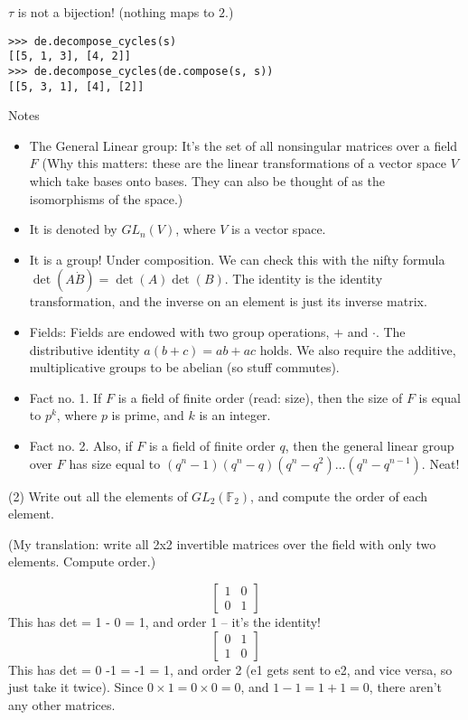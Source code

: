 \documentclass[1    0pt, answers]{exam} \renewcommand{\baselinestretch}{1.05}
\theoremstyle{plain}
\theoremstyle{definition}
\begin{document}
\begin{questions}
\begin{solution}
$\tau$ is not a bijection! (nothing maps to $2$.)
\begin{verbatim}
>>> de.decompose_cycles(s)
[[5, 1, 3], [4, 2]]
>>> de.decompose_cycles(de.compose(s, s))
[[5, 3, 1], [4], [2]]
\end{verbatim}
\end{solution}


\begin{solution}
\end{solution}

Notes
\begin{itemize}
    \item The General Linear group: It's the set of all nonsingular matrices over a field $F$ (Why this matters: these are the linear transformations of a vector space $V$ which take bases onto bases. They can also be thought of as the isomorphisms of the space.)
    \item It is denoted by $GL_n(V)$, where $V$ is a vector space.
    \item It is a group! Under composition. We can check this with the nifty formula $\det(A \dot B) = \det(A) \det(B)$. The identity is the identity transformation, and the inverse on an element is just its inverse matrix.
    \item Fields: Fields are endowed with two group operations, $+$ and $\cdot$. The distributive identity $a(b + c) = ab + ac$ holds. We also require the additive, multiplicative groups to be abelian (so stuff commutes).
    \item Fact no. 1. If $F$ is a field of finite order (read: size), then the size of $F$ is equal to $p^k$, where $p$ is prime, and $k$ is an integer.
    \item Fact no. 2. Also, if $F$ is a field of finite order $q$, then the general linear group over $F$ has size equal to $(q^n - 1)(q^n - q)(q^n - q^2)\ldots(q^n - q^{n-1})$. Neat!
\end{itemize}

\question (2) Write out all the elements of $GL_2(\mathbb{F}_2)$, and compute the order of each element.

(My translation: write all 2x2 invertible matrices over the field with only two elements. Compute order.)

\begin{solution}
\[
\begin{bmatrix}
1 & 0 \\
0 & 1
\end{bmatrix} \] 
This has det = 1 - 0 = 1, and order 1 -- it's the identity!
\[
\begin{bmatrix}
0 & 1 \\
1 & 0
\end{bmatrix} \]
This has det = 0 -1 = -1 = 1, and order 2 (e1 gets sent to e2, and vice versa, so just take it twice).
Since $0 \times 1 = 0 \times 0 = 0$, and $1 - 1 = 1 + 1 = 0$, there aren't any other matrices.
\end{solution}


\end{questions}
\end{document}
